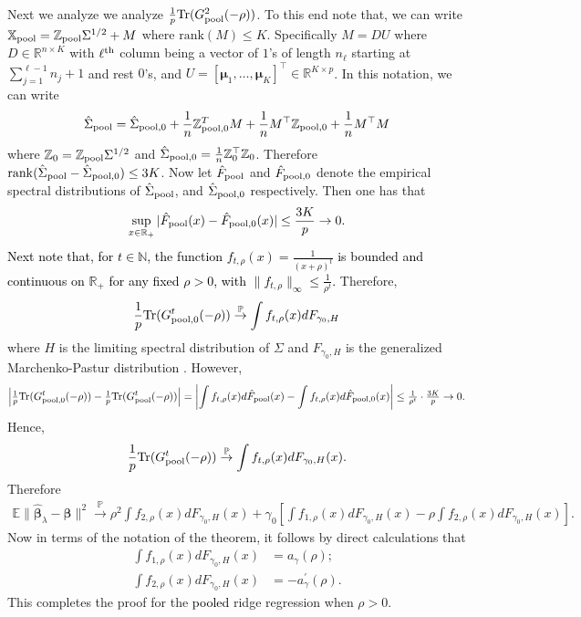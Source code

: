 \documentclass{article}
\theoremstyle{plain}
\theoremstyle{remark}
\def \bbeta{\boldsymbol{\beta}}
\def \bbeta{\boldsymbol{\beta}}
\def \Xm {\mathbb{X}_{\rm pool}}
\def \tr {\mathrm{Tr}}
\def \E{\mathbb{E}}
\def \P{\mathbb{P}}
\def \bmu{\pmb{\mu}}
\begin{document}
Next we analyze we analyze $\frac 1p\tr (G_{\rm pool}^2(-\rho))$. To this end note that, we can write $\Xm=\mathbb{Z}_{\rm pool}\Sigma^{1/2}+M$ where $\mathrm{rank}(M)\leq K$. Specifically $M=DU$ where $D\in \mathbb{R}^{n\times K}$ with $\ell^{\rm th}$ column being a vector of $1$'s of length $n_{\ell}$ starting at $\sum_{j=1}^{\ell-1} n_j+1$ and rest $0$'s, and $U=[\bmu_1,\ldots,\bmu_K]^\top\in \mathbb{R}^{K \times p}$. In this notation, we can write $$\hat{\Sigma}_{\rm pool}=\hat{\Sigma}_{\rm pool,0}+\frac{1}{n}\mathbb{Z}_{\rm pool,0}^T M+\frac{1}{n}M^\top\mathbb{Z}_{\rm pool,0}+\frac{1}{n}M^\top M$$ where $\mathbb{Z}_0=\mathbb{Z}_{\rm pool}\Sigma^{1/2}$ and $\hat{\Sigma}_{\rm pool,0}=\frac 1n \mathbb{Z}_0^\top \mathbb{Z}_0$. Therefore $\mathrm{rank}(\hat{\Sigma}_{\rm pool}-\hat{\Sigma}_{\rm pool,0})\leq 3K$. Now let $\hat{F}_{\rm pool}$ and $\hat{F}_{\rm pool,0}$ denote the empirical spectral distributions of  $\hat{\Sigma}_{\rm pool}$, and $\hat{\Sigma}_{\rm pool,0}$ respectively. Then \citep[Theorem A.43]{bai2010spectral} one has that
\begin{align*}
    \sup\limits_{x\in \mathbb{R}_+}|\hat{F}_{\rm pool}(x)-\hat{F}_{\rm pool,0}(x)|\leq \frac{3K}{p}\to 0.
\end{align*}
\textcolor{black}{Next note that, for $t\in\mathbb{N}$, the function $f_{t,\rho}(x)=\frac{1}{(x+\rho)^t}$ is bounded and continuous on $\mathbb{R}_+$ for any fixed $\rho>0$, with $\|f_{t,\rho}\|_{\infty}\leq \frac{1}{\rho^t}$.} Therefore,
\begin{align*}
    \frac{1}{p}\tr(G^t_{\rm pool,0}(-\rho))\stackrel{\P}{\to} \int f_{t,\rho}(x)dF_{\gamma_0,H}
\end{align*}
where $H$ is the limiting spectral distribution of $\Sigma$ and $F_{\gamma_0,H}$ is the generalized Marchenko-Pastur distribution \citep{bai2010spectral}. However,
\begin{align*}
    \left|\tfrac{1}{p}\tr(G^t_{\rm pool,0}(-\rho))-\tfrac{1}{p}\tr(G^t_{\rm pool}(-\rho))\right|=\left|\int f_{t,\rho}(x)d\hat{F}_{\rm pool}(x)-\int f_{t,\rho}(x)d\hat{F}_{\rm pool,0}(x)\right|\leq \textcolor{black}{\tfrac{1}{\rho^t}}\cdot \tfrac{3K}{p}\to 0.
\end{align*}
Hence,
\begin{align*}
    \frac{1}{p}\tr(G^t_{\rm pool}(-\rho))\stackrel{\P}{\to} \int f_{t,\rho}(x)dF_{\gamma_0,H}(x).
\end{align*}
Therefore
\begin{align*}
    \E\|\hat{\bbeta}_{\lambda}-\bbeta\|^2\stackrel{\P}{\to} \rho^2 \int f_{2,\rho}(x)dF_{\gamma_0,H}(x)+\gamma_0\left[\int f_{1,\rho}(x)dF_{\gamma_0,H}(x)-\rho \int f_{2,\rho}(x)dF_{\gamma_0,H}(x)\right].
\end{align*}
Now in terms of the notation of the theorem, it follows by direct calculations that
\begin{align*}
    \int f_{1,\rho}(x)dF_{\gamma_0,H}(x)&=a_{\gamma}(\rho);\\
    \int f_{2,\rho}(x)dF_{\gamma_0,H}(x)&=-a^{'}_{\gamma}(\rho).
\end{align*}
This completes the proof for the \textcolor{black}{pooled} ridge regression when $\rho>0$.
\end{document}
